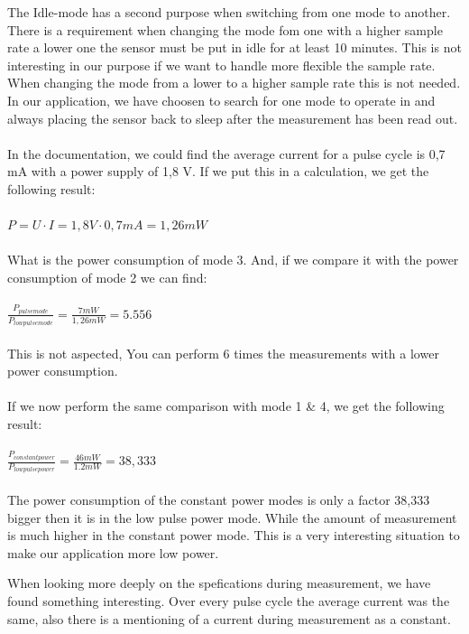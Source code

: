\documentclass[11pt,a4paper]{article}
\begin{document}
The Idle-mode has a second purpose when switching from one mode to another. There is a requirement when changing the mode fom one with a higher sample rate a lower one the sensor must be put in idle for at least 10 minutes. This is not interesting in our purpose if we want to handle more flexible the sample rate. When changing the mode from a lower to a higher sample rate this is not needed. In our application, we have choosen to search for one mode to operate in and always placing the sensor back to sleep after the measurement has been read out.
\\ \\
In the documentation, we could find the average current for a pulse cycle is 0,7 mA with a power supply of 1,8 V. If we put this in a calculation, we get the following result:
\\ \\
$P= U \cdot I=1,8 V \cdot 0,7 mA = 1,26 mW$
\\ \\
What is the power consumption of mode 3. And, if we compare it with the power consumption of mode 2 we can find:
\\ \\
$\frac{P_{pulse mode}}{P_{low pulse mode}}= \frac{7 mW}{1,26 mW}= 5.556$
\\ \\
This is not aspected, You can perform 6 times the measurements with a lower power consumption.
\\ \\
If we now perform the same comparison with mode 1 \& 4, we get the following result:
\\ \\
$\frac{P_{constant power}} {P_{low pulse power}}= \frac{46mW}{1.2 mW}= 38,333$
\\ \\
The power consumption of the constant power modes  is only a factor 38,333 bigger then it is in the low pulse power mode. While the amount of measurement is much higher in the constant power mode. This is a very interesting situation to make our application more low power.


 


When looking more deeply on the spefications during measurement, we have found something interesting. Over every pulse cycle the average current was the same, also there is a mentioning of a current during measurement as a constant. 

\end{document}
